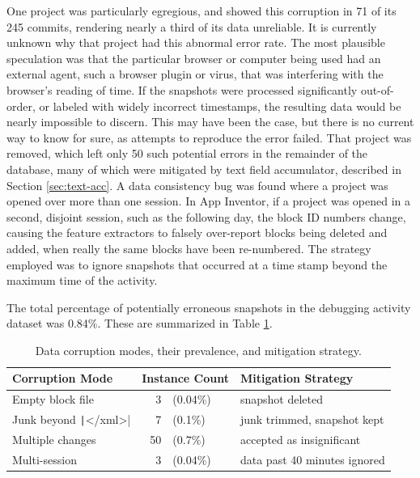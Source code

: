 One project was particularly egregious, and showed this corruption in 71 of its 245 commits, rendering nearly a third of its data unreliable. It is currently unknown why that project had this abnormal error rate. The most plausible speculation was that the particular browser or computer being used had an external agent, such a browser plugin or virus, that was interfering with the browser's reading of time. If the snapshots were processed significantly out-of-order, or labeled with widely incorrect timestamps, the resulting data would be nearly impossible to discern. This may have been the case, but there is no current way to know for sure, as attempts to reproduce the error failed.
That project was removed, which left only 50 such potential errors in the remainder of the database, many of which were mitigated by text field accumulator, described in Section \ref{sec:text-acc}. 
A data consistency bug was found where a project was opened over more than one session. In App Inventor, if a project was opened in a second, disjoint session, such as the following day, the block ID numbers change, causing the feature extractors to falsely over-report blocks being deleted and added, when really the same blocks have been re-numbered. The strategy employed was to ignore snapshots that occurred at a time stamp beyond the maximum time of the activity.

The total percentage of potentially erroneous snapshots in the debugging activity dataset was 0.84\%. These are summarized in Table \ref{tab:data-corruption}.

	
\begin{table}
\begin{centering}
	\begin{tabular}{l r l p{5.4cm}}
	Corruption Mode 		& \multicolumn{2}{l}{Instance Count} 		& Mitigation Strategy 			\\ \hline
	Empty block file 						&  3 &(0.04\%) 				& snapshot deleted 						\\
	Junk beyond \texttt|</xml>| 	&  7 &(0.1\%) 				& junk trimmed, snapshot kept 			\\
	Multiple changes 						& 50 &(0.7\%) 				& accepted as insignificant 			\\
	Multi-session 							&  3 &(0.04\%) 				& data past 40 minutes ignored
	\end{tabular}
	\caption[Data Corruption Modes]{Data corruption modes, their prevalence, and mitigation strategy.}
	\label{tab:data-corruption}
\end{centering}
\end{table}


